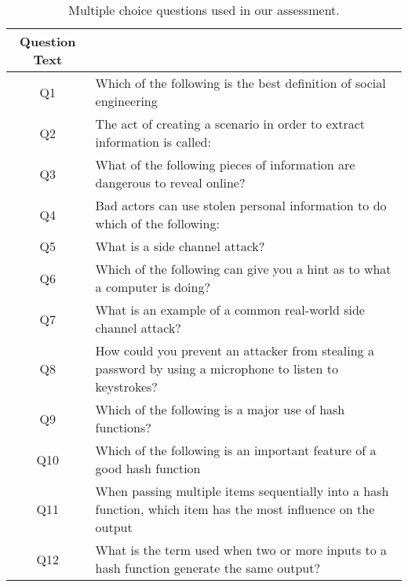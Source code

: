 

\begin{table}[h]
  \scriptsize
  \begin{tabular}{c | p{6cm}}
Question Text  &     \\
\hline
Q1 & Which of the following is the best definition of social engineering \\
Q2  & The act of creating a scenario in order to extract information is called:   \\
Q3 & What of the following pieces of information are dangerous to reveal online?  \\
Q4  & Bad actors can use stolen personal information to do which of the following: \\
Q5 & What is a side channel attack?  \\
Q6  & Which of the following can give you a hint as to what a computer is doing?   \\
Q7 & What is an example of a common real-world side channel attack? \\
Q8  & How could you prevent an attacker from stealing a password by using a microphone to listen to keystrokes?\\
Q9 & Which of the following is a major use of hash functions? \\
Q10 & Which of the following is an important feature of a good hash function  \\
Q11 & When passing multiple items sequentially into a hash function, which item has the most influence on the output \\
Q12 & What is the term used when two or more inputs to a hash function generate the same output? \\
\end{tabular}
\caption{Multiple choice questions used in our assessment.}
\label{fig:assessment}
\end{table}



